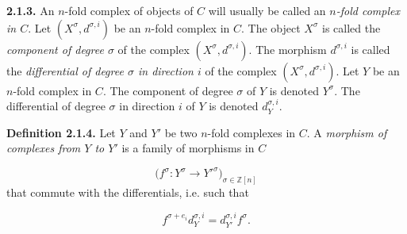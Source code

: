 \noindent\textbf{2.1.3.}\quad
An $n$-fold complex of objects of $C$ will usually be called an
\emph{$n$-fold complex in $C$}. Let $(X^\sigma,d^{\sigma,i})$ be an
$n$-fold complex in $C$.
The object $X^\sigma$ is called the \emph{component of degree $\sigma$}
of the complex $(X^\sigma,d^{\sigma,i})$.
The morphism $d^{\sigma,i}$ is called the \emph{differential of degree
$\sigma$ in direction $i$} of the complex $(X^\sigma,d^{\sigma,i})$.
Let $Y$ be an $n$-fold complex in $C$. The component of degree $\sigma$
of $Y$ is denoted $Y^\sigma$. The differential of degree $\sigma$ in
direction $i$ of $Y$ is denoted $d_Y^{\sigma,i}$.

\noindent\textbf{Definition 2.1.4.}\quad
Let $Y$ and $Y'$ be two $n$-fold complexes in $C$. A \emph{morphism of
complexes from $Y$ to $Y'$} is a family of morphisms in $C$

\begin{equation*}
  \bigl(f^\sigma\colon Y^\sigma\longrightarrow Y'^{\sigma}\bigr)_{
    \sigma\in\mathbb Z[n]}
\end{equation*}
that commute with the differentials, i.e. such that

\begin{equation}
  f^{\sigma+e_i}d_Y^{\sigma,i}
  =d_{Y'}^{\sigma,i}f^\sigma.
  \tag{2.1.4.1}
\end{equation}
